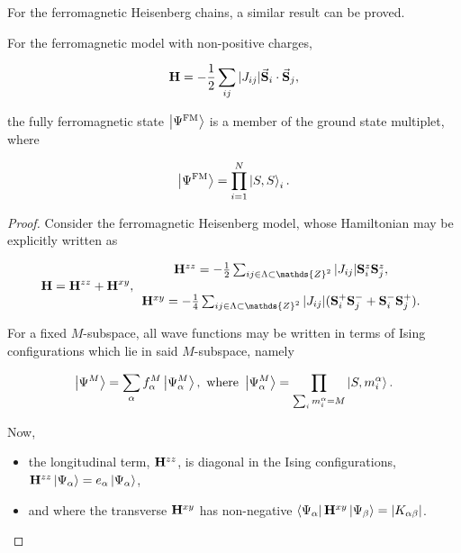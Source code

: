 \documentclass{homework}
\begin{document}
For the ferromagnetic Heisenberg chains, a similar result can be proved. 

\begin{corr}
For the ferromagnetic model with non-positive charges, 

$$
{\bf H} = - \frac{1}{2} \sum_{ij} |J_{ij}| \vec{{\bf S}}_i \cdot \vec{{\bf S}}_j,
$$

the fully ferromagnetic state $\ket{\Psi^{\textnormal{FM}}}$ is a member of the ground state multiplet, where 

$$
    \ket{\Psi^{\textnormal{FM}}} = \prod_{i=1}^N \ket{S, S}_i.
$$

\end{corr}

\begin{proof}

Consider the ferromagnetic Heisenberg model, whose Hamiltonian may be explicitly written as 

\begin{equation}
     {\bf H} = {\bf H}^{zz} + {\bf H}^{xy}, \begin{array}{c}
         {\bf H}^{zz} = -\frac{1}{2} \sum_{ij \in \Lambda \subset \mathds{Z}^{2}} |J_{ij}| \spin_i^z \spin_j^z, \\  
         \\
         {\bf H}^{xy} = -\frac{1}{4} \sum_{ij \in \Lambda \subset \mathds{Z}^{2}} |J_{ij}| (\spin_i^+ \spin_j^- + \spin_i^- \spin_j^+). \\  
    \end{array}
\end{equation}

For a fixed $M$-subspace, all wave functions may be written in terms of Ising configurations which lie in said $M$-subspace, namely

\begin{equation}
    \ket{\Psi^M} = \sum_{\alpha} f_{\alpha}^M \ket{{\Psi}^M_{\alpha}}, \textnormal{ where } \ket{{\Psi}^M_{\alpha}} = \prod_{\sum_{i} {m}_i^\alpha = M} \ket{S, {m}_i^\alpha}. 
\end{equation}

Now, 

\begin{itemize}
    \item the longitudinal term, ${{\bf H}}^{zz}$, is diagonal in the Ising configurations, ${{\bf H}}^{zz}\ket{{\Psi}_{\alpha}} = e_{\alpha} \ket{{\Psi}_{\alpha}}$,
    \item and where the transverse ${{\bf H}}^{xy}$ has non-negative $\bra{{\Psi}_{\alpha}} {{\bf H}}^{xy}  \ket{{\Psi}_{\beta}} = |K_{\alpha \beta}|$.
\end{itemize}


\end{proof}
\end{document}
